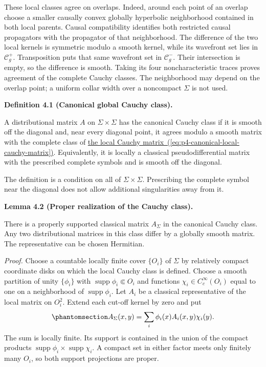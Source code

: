 \documentclass[
  english,
  11pt,
  reqno]{amsart}
\makeatletter
\newcommand{\pandocstatementheading}[1]{%
  \par\if@nobreak\else
    \addpenalty{\@beginparpenalty}%
    \addvspace{.5\baselineskip plus .2\baselineskip minus .2\baselineskip}%
  \fi
  {\normalfont\bfseries #1\par}%
  \nobreak\@afterindenttrue\@afterheading
}
\makeatother
\begin{document}
These local classes agree on overlaps. Indeed, around each point of an
overlap choose a smaller causally convex globally hyperbolic
neighborhood contained in both local parents. Causal compatibility
identifies both restricted causal propagators with the propagator of
that neighborhood. The difference of the two local kernels is symmetric
modulo a smooth kernel, while its wavefront set lies in
\(\mathcal C_g^+\). Transposition puts that same wavefront set in
\(\mathcal C_g^-\). Their intersection is empty, so the difference is
smooth. Taking its four noncharacteristic traces proves agreement of the
complete Cauchy classes. The neighborhood may depend on the overlap
point; a uniform collar width over a noncompact \(\Sigma\) is not used.

\pandocstatementheading{\protect{}\label{def:p4-canonical-cauchy-class}Definition 4.1 (Canonical global Cauchy class).}

A distributional matrix \(A\) on \(\Sigma\times\Sigma\) has the
canonical Cauchy class if it is smooth off the diagonal and, near every
diagonal point, it agrees modulo a smooth matrix with the complete class
of \hyperref[eq:p4-canonical-local-cauchy-matrix]{the local Cauchy
matrix~(\ref*{eq:p4-canonical-local-cauchy-matrix})}. Equivalently, it is locally a classical pseudodifferential
matrix with the prescribed complete symbols and is smooth off the
diagonal.

The definition is a condition on all of \(\Sigma\times\Sigma\).
Prescribing the complete symbol near the diagonal does not allow
additional singularities away from it.

\pandocstatementheading{\protect{}\label{lem:p4-proper-cauchy-representative}Lemma 4.2 (Proper realization of the Cauchy class).}

There is a properly supported classical matrix \(A_\Sigma\) in the
canonical Cauchy class. Any two distributional matrices in this class
differ by a globally smooth matrix. The representative can be chosen
Hermitian.

\emph{Proof.} Choose a countable locally finite cover \(\{O_i\}\) of
\(\Sigma\) by relatively compact coordinate disks on which the local
Cauchy class is defined. Choose a smooth partition of unity
\(\{\phi_i\}\) with \(\operatorname{supp}\phi_i\Subset O_i\) and
functions \(\chi_i\in C_c^\infty(O_i)\) equal to one on a neighborhood
of \(\operatorname{supp}\phi_i\). Let \(A_i\) be a classical
representative of the local matrix on \(O_i^2\). Extend each cut-off
kernel by zero and put
\begin{equation}\protect\phantomsection\label{eq:p4-proper-cauchy-gluing}{
A_\Sigma(x,y)=\sum_i\phi_i(x)A_i(x,y)\chi_i(y).
}\end{equation} The sum is locally finite. Its support is contained in
the union of the compact products
\(\operatorname{supp}\phi_i\times\operatorname{supp}\chi_i\). A compact
set in either factor meets only finitely many \(O_i\), so both support
projections are proper.
\end{document}
